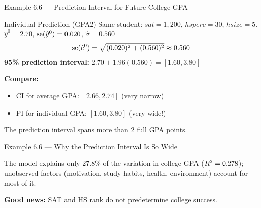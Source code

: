 \documentclass[aspectratio=169, 12pt]{beamer}
\begin{document}
\begin{frame}[shrink=8]{Example 6.6 --- Prediction Interval for Future College GPA}

  \begin{examplebox}{Individual Prediction (GPA2)}
    Same student: $sat = 1{,}200$, $hsperc = 30$, $hsize = 5$. \\[4pt]
    $\hat{y}^0 = 2.70$, $\operatorname{se}(\hat{y}^0) = 0.020$, $\hat\sigma = 0.560$
    \[
      \operatorname{se}(\hat{e}^0) = \sqrt{(0.020)^2 + (0.560)^2} \approx 0.560
    \]
    \textbf{95\% prediction interval:} $2.70 \pm 1.96(0.560) = [1.60, 3.80]$
  \end{examplebox}

  \medskip

      \textbf{Compare:}
      \begin{itemize}
        \item CI for average GPA: $[2.66, 2.74]$ (very narrow)
        \item PI for individual GPA: $[1.60, 3.80]$ (very wide!)
      \end{itemize}

      \medskip

      The prediction interval spans more than 2 full GPA points.

\end{frame}

\begin{frame}{Example 6.6 --- Why the Prediction Interval Is So Wide}

  \begin{keybox}
    The model explains only $27.8\%$ of the variation in college GPA ($R^2 = 0.278$);
    unobserved factors (motivation, study habits, health, environment) account for most
    of it.

    \smallskip
    \textbf{Good news:} SAT and HS rank do not predetermine college success.
  \end{keybox}

\end{frame}
\end{document}

